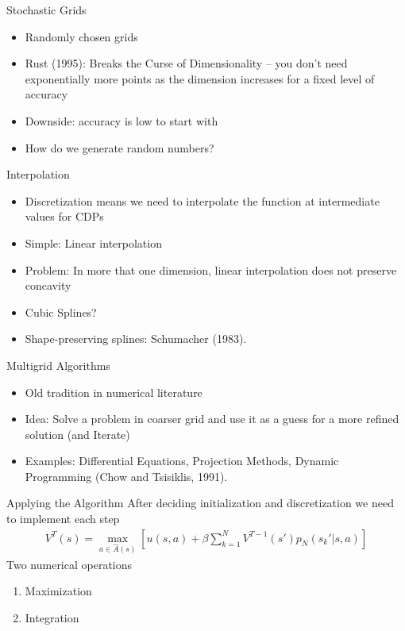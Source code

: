 \documentclass[aspectratio=169,11pt]{beamer}
\begin{document}
\begin{frame}{Stochastic Grids}
\begin{itemize}
\item Randomly chosen grids
\item Rust (1995): Breaks the Curse of Dimensionality -- you don't need exponentially more points as the dimension increases for a fixed level of accuracy
\item Downside: accuracy is low to start with
\item How do we generate random numbers?
\end{itemize}
\end{frame}

\begin{frame}{Interpolation}
\begin{itemize}
\item Discretization means we need to interpolate the function at intermediate values for CDPs
\item Simple: Linear interpolation
\item Problem: In more that one dimension, linear interpolation does not preserve concavity
\item Cubic Splines?
\item Shape-preserving splines: Schumacher (1983).
\end{itemize}
\end{frame}

\begin{frame}{Multigrid Algorithms}
\begin{itemize}
\item Old tradition in numerical literature
\item Idea: Solve a problem in coarser grid and use it as a guess for a more refined solution (and Iterate)
\item Examples: Differential Equations, Projection Methods, Dynamic Programming (Chow and Tsisiklis, 1991).
\end{itemize}
\end{frame}

\begin{frame}{Applying the Algorithm}
After deciding initialization and discretization we need to implement each step
\begin{eqnarray*}
V^T(s) = \max_{a \in \hat{A}(s)} \left[  u(s,a) + \beta \sum_{k=1}^N V^{T-1}(s')p_N (s_k' | s,a) \right]
\end{eqnarray*}
Two numerical operations
\begin{enumerate}
\item Maximization
\item Integration
\end{enumerate}
\end{frame}
\end{document}
